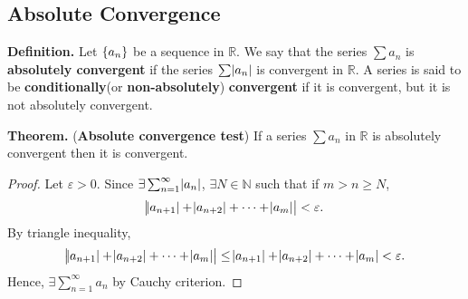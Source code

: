 \documentclass[12pt,a4paper]{article}
\begin{document}
\newpage
\subsection{Absolute Convergence}
\begin{tcolorbox}[colback=white]
	\textbf{Definition.} Let $\set{a_n}$ be a sequence in $\mathbb{R}$. We say that the series $\sum a_n$ is \textbf{absolutely convergent} if the series $\sum\abs{a_n}$ is convergent in $\mathbb{R}$. A series is said to be \textbf{conditionally}(or \textbf{non-absolutely}) \textbf{convergent} if it is convergent, but it is not absolutely convergent.
\end{tcolorbox}

\begin{tcolorbox}[colback=white]
	\textbf{Theorem.} (\textbf{Absolute convergence test}) If a series $\sum a_n$ in $\mathbb{R}$ is absolutely convergent then it is convergent.\tcblower\begin{proof}
		Let $\varepsilon>0$. Since $\exists\sum_{n=1}^\infty\abs{a_n}$, $\exists N\in\mathbb{N}$ such that if $m>n\geq N$, \[
		\abs{\abs{a_{n+1}}+\abs{a_{n+2}}+\cdots+\abs{a_m}}<\varepsilon.
		\] By triangle inequality, \[
		\abs{\abs{a_{n+1}}+\abs{a_{n+2}}+\cdots+\abs{a_m}}\leq \abs{a_{n+1}}+\abs{a_{n+2}}+\cdots+\abs{a_m}<\varepsilon.
		\] Hence, $\exists\sum_{n=1}^\infty a_n$ by Cauchy criterion.
	\end{proof}
\end{tcolorbox}

\newpage
\end{document}

